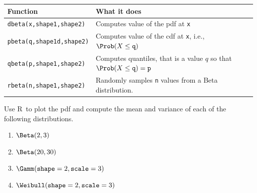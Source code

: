\documentclass[twoside]{book}\usepackage[]{graphicx}\usepackage[]{xcolor}
\newenvironment{knitrout}{}{} %
\def\R{{\sf R}}
\begin{document}
\begin{knitrout}
{}



\end{knitrout}

\begin{center}
\begin{tabular}{ll}
	\hline
	Function & What it does \\
	\hline
	\texttt{dbeta(x,shape1,shape2)} & Computes value of the pdf at \texttt{x}
	\\
	\texttt{pbeta(q,shape1d,shape2)} 
		& Computes value of the cdf at \texttt{x}, i.e., 
	$\Prob(X \le \texttt{q})$
	\\
	\texttt{qbeta(p,shape1,shape2)} 
		& Computes quantiles, that is a value $q$ so that 
	$\Prob(X \le \texttt{q}) = \texttt{p}$
    \\
	\texttt{rbeta(n,shape1,shape2)} & Randomly samples \texttt{n} values from a
	Beta distribution.
	\\
	\hline
\end{tabular}
\end{center}

\begin{problem}
	Use \R\ to plot the pdf and 
	compute the mean and variance of each of the following distributions.
	\begin{enumerate}
		\item
			$\Beta(2,3)$
		\item
			$\Beta(20,30)$
		\item
			$\Gamm(\texttt{shape}=2,\texttt{scale}=3)$
		\item
			$\Weibull(\texttt{shape}=2,\texttt{scale}=3)$
	\end{enumerate}
\end{problem}
\end{document}
